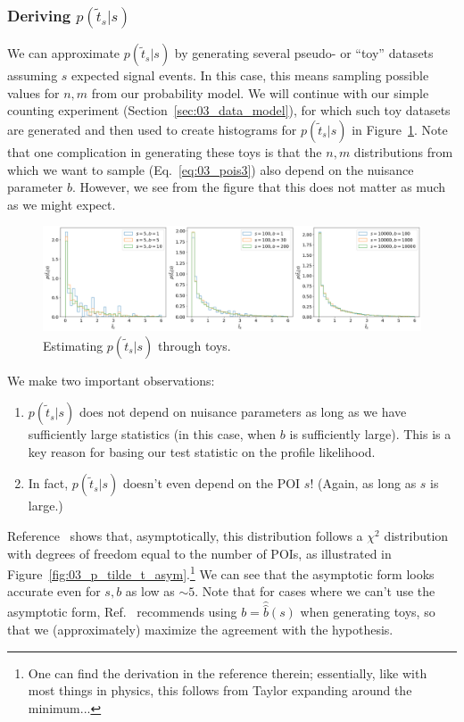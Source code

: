\subsubsection{Deriving \texorpdfstring{$p(\tilde{t}_s|s)$}{p(ts|s)}}

We can approximate $p(\tilde{t}_s|s)$ by generating several pseudo- or ``toy'' datasets assuming $s$ expected signal events. 
In this case, this means sampling possible values for $n, m$ from our probability model.
We will continue with our simple counting experiment (Section~\ref{sec:03_data_model}), for which such toy datasets are generated and then used to create histograms for $p(\tilde{t}_s|s)$ in Figure~\ref{fig:03_p_tilde_t}.
Note that one complication in generating these toys is that the $n, m$ distributions from which we want to sample (Eq.~\ref{eq:03_pois3}) also depend on the nuisance parameter $b$.
However, we see from the figure that this does not matter as much as we might expect.

\begin{figure}[htb]
\centering
\includegraphics[width=\textwidth]{figures/03-Stats/02-hypothesis-testing/1.png}
\captionsetup{justification=centering}
\caption{Estimating $p(\tilde{t}_s|s)$ through toys.}
\label{fig:03_p_tilde_t}
\end{figure}

We make two important observations:
\begin{enumerate}
    \item $p(\tilde{t}_s|s)$ does not depend on nuisance parameters as long as we have sufficiently large statistics (in this case, when $b$ is sufficiently large). 
    This is a key reason for basing our test statistic on the profile likelihood.
    \item In fact, $p(\tilde{t}_s|s)$ doesn't even depend on the POI $s$! (Again, as long as $s$ is large.)
\end{enumerate}

Reference~\cite{Cowan:2010js} shows that, asymptotically, this distribution follows a $\chi^2$ distribution with degrees of freedom equal to the number of POIs, as illustrated in Figure~\ref{fig:03_p_tilde_t_asym}.\footnote{One can find the derivation in the reference therein; essentially, like with most things in physics, this follows from Taylor expanding around the minimum...}
We can see that the asymptotic form looks accurate even for $s, b$ as low as $\sim5$.
Note that for cases where we can't use the asymptotic form, Ref.~\cite{Cranmer:2014lly} recommends using $b = \hat{\hat{b}}(s)$ when generating toys, so that we (approximately) maximize the agreement with the hypothesis.

